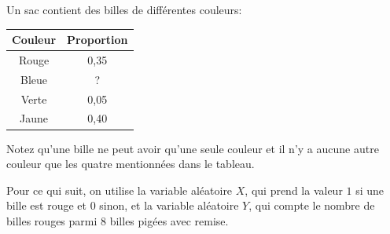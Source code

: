 \begin{questions}
\pageblanche
\question\label{couleur} Un sac contient des billes de différentes couleurs:



\begin{table}[h]
    \centering
\begin{tabular}{|c|c|}
\hline
    Couleur & Proportion\\
    \hline
     Rouge&  0,35\\
     Bleue& ?\\
     Verte& 0,05 \\
     Jaune& 0,40\\
     \hline
\end{tabular}
    \label{tab:billes}
\end{table}

Notez qu'une bille ne peut avoir qu'une seule couleur et il n'y a aucune autre couleur que les quatre mentionnées dans le tableau.


Pour ce qui suit, on utilise la variable aléatoire $X$, qui prend la valeur $1$ si une bille est rouge et $0$ sinon, et la variable aléatoire $Y$, qui compte le nombre de billes rouges parmi 8 billes pigées avec remise.


\end{questions}
